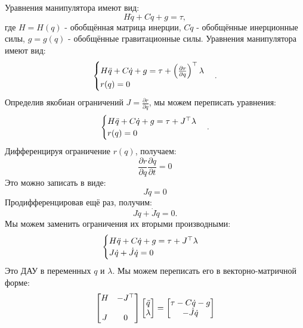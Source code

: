 Уравнения манипулятора имеют вид:
%
\begin{equation}
	{H} \ddot{{q}} + {C} \dot{{q}} + {g} = \tau,
\end{equation}
%
где ${H}={H}({q})$ - обобщённая матрица инерции, ${C}\dot{{q}}$ - обобщённые инерционные силы, ${g}={g}({q})$ - обобщённые гравитационные силы.
Уравнения манипулятора имеют вид:
%
\begin{equation}
	\begin{cases}
		{H} \ddot{{q}} + {C} \dot{{q}} + {g} = \tau + \left( \frac{\partial {r}}{\partial {q}} \right)^\top \lambda
		\\
		{r}({q}) = 0
	\end{cases}.
\end{equation}
%
Определив якобиан ограничений ${J} = \frac{\partial {r}}{\partial {q}}$, мы можем переписать уравнения:
%
\begin{equation}
	\begin{cases}
		{H} \ddot{{q}} + {C} \dot{{q}} + {g} = \tau + {J}^\top \lambda
		\\
		{r}({q}) = 0
	\end{cases}.
\end{equation}
Дифференцируя ограничение ${r}({q})$, получаем:
%
\begin{equation}
	\frac{\partial {r}}{\partial {q}} \frac{\partial {q}}{\partial t} = 0
\end{equation}
%
Это можно записать в виде:
%
\begin{equation}
	{J} \dot{{q}} = 0
\end{equation}
%
Продифференцировав ещё раз, получим:
%
\begin{equation}
	{J} \ddot{{q}} + \dot{{J}} \dot{{q}} = 0.
\end{equation}
%
Мы можем заменить ограничения их вторыми производными:
%
\begin{equation}
	\begin{cases}
		{H} \ddot{{q}} + {C} \dot{{q}} + {g} = \tau + {J}^\top \lambda
		\\
		{J} \dot{{q}} + \dot{{J}} \dot{{q}} = 0
	\end{cases}
\end{equation}
%
Это ДАУ в переменных ${q}$ и $\lambda$. Мы можем переписать его в векторно-матричной форме:
%
\begin{equation}
	\begin{bmatrix}
		{H} & -{J}^\top \\\\
		{J} & 0
	\end{bmatrix}
	\begin{bmatrix}
		\ddot{{q}} \\
		\lambda
	\end{bmatrix}
	=
	\begin{bmatrix}
		\tau - {C} \dot{{q}} - {g} \\
		-\dot{{J}} \dot{{q}}
	\end{bmatrix}
\end{equation}
